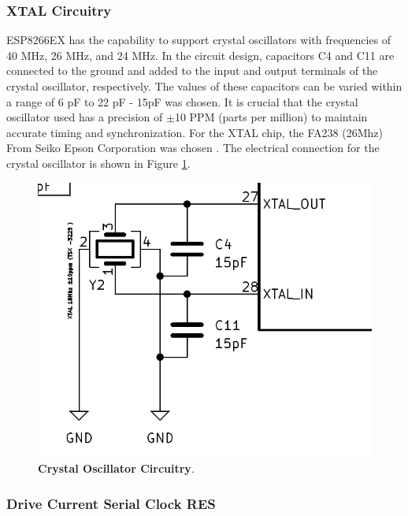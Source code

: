 \subsubsection{XTAL Circuitry}\label{02SubSub:XTALCircuitry}

ESP8266EX has the capability to support crystal oscillators with frequencies of 40 MHz, 26 MHz, and 24 MHz. 
In the circuit design, capacitors C4 and C11 are connected to the ground and added to the input and output terminals 
of the crystal oscillator, respectively. The values of these capacitors can be varied within a range of 6 pF to 22 pF -
15pF was chosen. It is crucial that the crystal oscillator used has a precision of 
$\pm$10 PPM (parts per million) to maintain accurate timing and synchronization. For the XTAL chip, the FA238 (26Mhz)
From Seiko Epson Corporation was chosen \cite{FA238}. The electrical connection for the crystal oscillator is shown
in Figure \ref{02fig:XTALCircuitry}.


\begin{figure}[H]
    \centering
    \includegraphics[scale = 0.5]{imagens/XTALCircuitry.png}
    \caption{\textbf{Crystal Oscillator Circuitry}.}
    \label{02fig:XTALCircuitry}
\end{figure}


\subsubsection{Drive Current Serial Clock RES}\label{02SubSub:DriveCurrentSerialClockRES}

